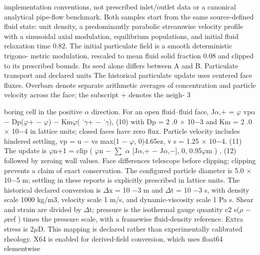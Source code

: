 \documentclass[11pt]{article}
\begin{document}
implementation conventions, not prescribed inlet/outlet data or a canonical analytical pipe-flow
benchmark.
Both samples start from the same source-defined fluid state: unit density, a predominantly
parabolic streamwise velocity profile with a sinusoidal axial modulation, equilibrium populations,
and initial fluid relaxation time 0.82. The initial particulate field is a smooth deterministic trigono-
metric modulation, rescaled to mean fluid solid fraction 0.08 and clipped to its prescribed bounds.
Its seed alone differs between A and B.
Particulate transport and declared units
The historical particulate update uses centered face fluxes. Overbars denote separate arithmetic
averages of concentration and particle velocity across the face; the subscript + denotes the neigh-
3

boring cell in the positive \ensuremath{\alpha} direction. For an open fluid–fluid face,
J\ensuremath{\alpha},+ = \ensuremath{\varphi} vp\ensuremath{\alpha} \ensuremath{-} Dp(\ensuremath{\varphi}+ \ensuremath{-} \ensuremath{\varphi}) \ensuremath{-} Km\ensuremath{\varphi}( ˙\ensuremath{\gamma}+ \ensuremath{-} ˙\ensuremath{\gamma}), (10)
with Dp = 2 .0 \ensuremath{\times} 10\ensuremath{-}3 and Km = 2 .0 \ensuremath{\times} 10\ensuremath{-}4 in lattice units; closed faces have zero flux. Particle
velocity includes hindered settling,
vp = u \ensuremath{-} vs max(1 \ensuremath{-} \ensuremath{\varphi}, 0)4.65ez, v s = 1.25 \ensuremath{\times} 10\ensuremath{-}4. (11)
The update is
\ensuremath{\varphi}n+1 = clip
(
\ensuremath{\varphi}n \ensuremath{-}
\ensuremath{\sum}
\ensuremath{\alpha}
[J\ensuremath{\alpha},+ \ensuremath{-} J\ensuremath{\alpha},\ensuremath{-}], 0, 0.95\ensuremath{\varphi}m
)
, (12)
followed by zeroing wall values. Face differences telescope before clipping; clipping prevents a claim
of exact conservation. The configured particle diameter is 5.0 \ensuremath{\times} 10\ensuremath{-}5 m; settling in these reports is
explicitly prescribed in lattice units.
The historical declared conversion is \ensuremath{\Delta}x = 10 \ensuremath{-}3 m and \ensuremath{\Delta}t = 10 \ensuremath{-}3 s, with density scale 1000
kg/m3, velocity scale 1 m/s, and dynamic-viscosity scale 1 Pa s. Shear and strain are divided by
\ensuremath{\Delta}t; pressure is the isothermal gauge quantity c2
s(\ensuremath{\rho} \ensuremath{-} \ensuremath{\rho}ref ) times the pressure scale, with a framewise
fluid-density reference. Extra stress is 2\ensuremath{\mu}D. This mapping is declared rather than experimentally
calibrated rheology. X64 is enabled for derived-field conversion, which uses float64 elementwise
\end{document}
